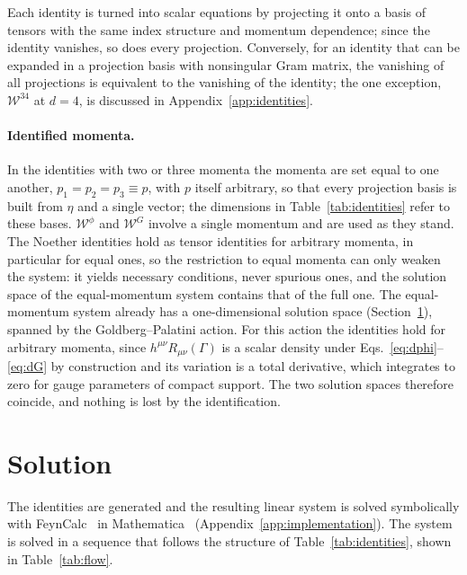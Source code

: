\documentclass[prd,aps,preprint,nofootinbib,amsmath,amssymb,eqsecnum]{revtex4-2}
\newcommand{\W}{\mathcal{W}}
\begin{document}
Each identity is turned into scalar equations by projecting it onto a basis of tensors with
the same index structure and momentum dependence; since the identity vanishes, so does every
projection. Conversely, for an identity that can be expanded in a projection basis with nonsingular
Gram matrix, the vanishing of all projections is equivalent to the vanishing of the identity;
the one exception, $\W^{34}$ at $d=4$, is discussed in Appendix~\ref{app:identities}.

\paragraph{Identified momenta.} In the identities with two or three momenta the momenta are
set equal to one another, $p_1=p_2=p_3\equiv p$, with $p$ itself arbitrary, so that every
projection basis is built from $\eta$ and a single vector; the dimensions in
Table~\ref{tab:identities} refer to these bases. $\W^{\phi}$ and $\W^{G}$ involve a single
momentum and are used as they stand. The Noether identities hold as tensor identities for
arbitrary momenta, in particular for equal ones, so the restriction to equal momenta can only weaken the
system: it yields necessary conditions, never spurious ones, and the solution space of the
equal-momentum system contains that of the full one. The equal-momentum system already has a
one-dimensional solution space (Section~\ref{sec:solution}), spanned by the
Goldberg--Palatini action. For this action the identities hold for arbitrary momenta, since
$h^{\mu\nu}R_{\mu\nu}(\Gamma)$ is a scalar density under
Eqs.~\eqref{eq:dphi}--\eqref{eq:dG} by construction and its variation is a total derivative,
which integrates to zero for gauge parameters of compact support. The two solution spaces
therefore coincide, and nothing is lost by the identification.

\section{Solution}
\label{sec:solution}

The identities are generated and the resulting linear system is solved symbolically with
FeynCalc~\cite{FeynCalc} in Mathematica~\cite{Mathematica} (Appendix~\ref{app:implementation}).
The system is solved in a sequence that follows the structure of
Table~\ref{tab:identities}, shown in Table~\ref{tab:flow}.
\end{document}
